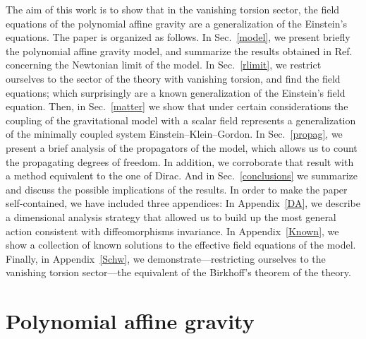 \documentclass[aps,prd,12pt,twocolumn,superscriptaddress,showpacs,showkeys,reprint%
]{revtex4-1}
\renewcommand{\(}{\left(}
\renewcommand{\)}{\right)}
\renewcommand{\[}{\left[}
\renewcommand{\]}{\right]}
\begin{document}
The aim of this work is to show that in the vanishing torsion sector, the field equations of the polynomial affine gravity are a generalization of the Einstein's equations. %
The paper is organized as follows. In Sec.~\ref{model}, we present briefly the polynomial affine gravity model, and summarize the results obtained in Ref.~\cite{Skirzewski:2014eta} concerning the Newtonian limit of the model. In Sec.~\ref{rlimit}, we restrict ourselves to the sector of the theory with vanishing torsion, and find the field equations; which surprisingly are a known generalization of the Einstein's field equation. Then, in Sec.~\ref{matter} we show that under certain considerations the coupling of the gravitational model with a scalar field represents a generalization of the minimally coupled system Einstein--Klein--Gordon. In Sec.~\ref{propag}, we present a brief analysis of the propagators of the model, which allows us to count the propagating degrees of freedom. In addition, we corroborate that result with a method equivalent to the one of Dirac. And in Sec.~\ref{conclusions} we summarize and discuss the possible implications of the results. In order to make the paper self-contained, we have included three appendices: In Appendix~\ref{DA}, we describe a dimensional analysis strategy that allowed us to build up the most general action consistent with diffeomorphisms invariance. In Appendix~\ref{Known}, we show a collection of known solutions to the effective field equations of the model. Finally, in Appendix~\ref{Schw}, we demonstrate---restricting ourselves to the vanishing torsion sector---the equivalent of the Birkhoff's theorem of the theory.

\section{\label{model}Polynomial affine gravity}
\end{document}
